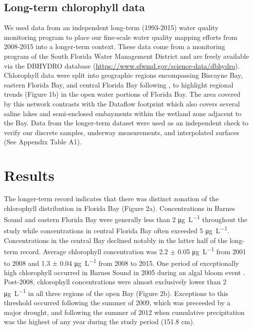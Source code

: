 \subsection{Long-term chlorophyll data}
\label{longtermchl}

We used data from an independent long-term (1993-2015) water quality monitoring program to place our fine-scale water quality mapping efforts from 2008-2015 into a longer-term context. These data come from a monitoring program of the South Florida Water Management District and are freely available via the DBHYDRO database (\href{https://www.sfwmd.gov/science-data/dbhydro}{https://www.sfwmd.gov/science-data/dbhydro}). Chlorophyll data were split into geographic regions encompassing Biscayne Bay, eastern Florida Bay, and central Florida Bay following \citet{boyer_seasonal_1999}, to highlight regional trends (Figure 1b) in the open water portions of Florida Bay. The area covered by this network contrasts with the Dataflow footprint which also covers several saline lakes and semi-enclosed embayments within the wetland zone adjacent to the Bay. Data from the longer-term dataset were used as an independent check to verify our discrete samples, underway measurements, and interpolated surfaces (See Appendix Table A1).

\section{Results}
\label{results}

The longer-term record indicates that there was distinct zonation of the chlorophyll distribution in Florida Bay (Figure 2a). Concentrations in Barnes Sound and eastern Florida Bay were generally less than 2 \si{\micro\gram\per\liter} throughout the study while concentrations in central Florida Bay often exceeded 5 \si{\micro\gram\per\liter}. Concentrations in the central Bay declined notably in the latter half of the long-term record. Average chlorophyll concentration was 2.2 $\pm$ 0.05 \si{\micro\gram\per\liter} from 2001 to 2008 and 1.3 $\pm$ 0.04 \si{\micro\gram\per\liter} from 2008 to 2015. One period of exceptionally high chlorophyll occurred in Barnes Sound in 2005 during an algal bloom event \citep{rudnick_2006}. Post-2008, chlorophyll concentrations were almost exclusively lower than 2 \si{\micro\gram\per\liter} in all three regions of the open Bay (Figure 2b). Exceptions to this threshold occurred following the summer of 2009, which was preceeded by a major drought, and following the summer of 2012 when cumulative precipitation was the highest of any year during the study period (151.8 cm).  

